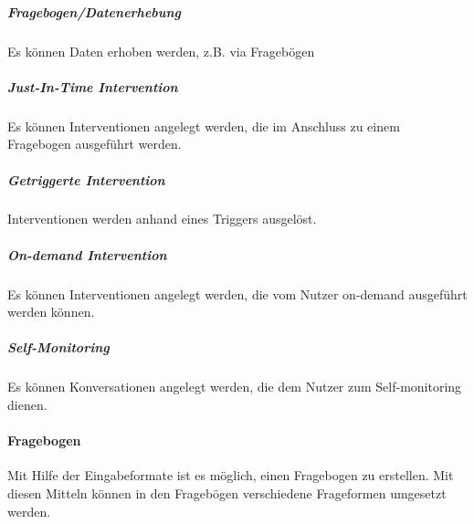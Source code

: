 \subparagraph{Fragebogen/Datenerhebung} Es können Daten erhoben werden, z.B. via Fragebögen
\subparagraph{Just-In-Time Intervention} Es können Interventionen angelegt werden, die im Anschluss zu einem Fragebogen ausgeführt werden.
\subparagraph{Getriggerte Intervention} Interventionen werden anhand eines Triggers  ausgelöst.
\subparagraph{On-demand Intervention} Es können Interventionen angelegt werden, die vom Nutzer on-demand ausgeführt werden können.
\subparagraph{Self-Monitoring} Es können Konversationen angelegt werden, die dem Nutzer zum Self-monitoring dienen.

\paragraph{Fragebogen}
Mit Hilfe der Eingabeformate ist es möglich, einen Fragebogen zu erstellen. Mit diesen Mitteln können in den Fragebögen verschiedene Frageformen umgesetzt werden.


